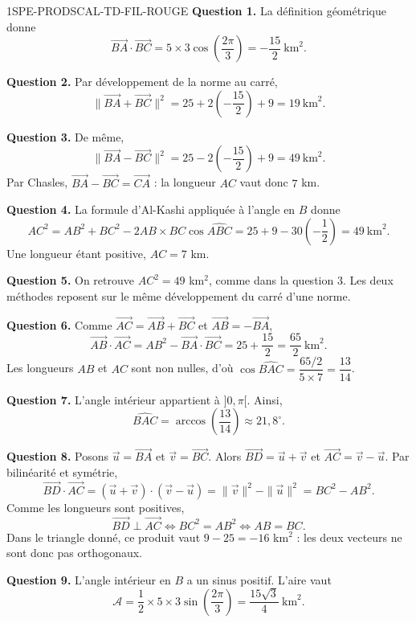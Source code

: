\ifnxVersionProfesseur
\begin{corrige}{1SPE-PRODSCAL-TD-FIL-ROUGE}
\textbf{Question 1.}
La définition géométrique donne
\[
\overrightarrow{BA}\cdot\overrightarrow{BC}
=5\times3\cos\left(\frac{2\pi}{3}\right)
=-\frac{15}{2}\ \text{km}^2.
\]

\textbf{Question 2.}
Par développement de la norme au carré,
\[
\|\overrightarrow{BA}+\overrightarrow{BC}\|^2
=25+2\left(-\frac{15}{2}\right)+9=19\ \text{km}^2.
\]

\textbf{Question 3.}
De même,
\[
\|\overrightarrow{BA}-\overrightarrow{BC}\|^2
=25-2\left(-\frac{15}{2}\right)+9=49\ \text{km}^2.
\]
Par Chasles, $\overrightarrow{BA}-\overrightarrow{BC}
=\overrightarrow{CA}$ : la longueur $AC$ vaut donc $7$ km.

\textbf{Question 4.}
La formule d'Al-Kashi appliquée à l'angle en $B$ donne
\[
AC^2=AB^2+BC^2-2AB\times BC\cos\widehat{ABC}
=25+9-30\left(-\frac12\right)=49\ \text{km}^2.
\]
Une longueur étant positive, $AC=7$ km.

\textbf{Question 5.}
On retrouve $AC^2=49$ km$^2$, comme dans la question 3.
Les deux méthodes reposent sur le même développement du carré d'une norme.

\textbf{Question 6.}
Comme $\overrightarrow{AC}=\overrightarrow{AB}+\overrightarrow{BC}$ et
$\overrightarrow{AB}=-\overrightarrow{BA}$,
\[
\overrightarrow{AB}\cdot\overrightarrow{AC}
=AB^2-\overrightarrow{BA}\cdot\overrightarrow{BC}
=25+\frac{15}{2}=\frac{65}{2}\ \text{km}^2.
\]
Les longueurs $AB$ et $AC$ sont non nulles, d'où
$\cos\widehat{BAC}=\dfrac{65/2}{5\times7}=\dfrac{13}{14}$.

\textbf{Question 7.}
L'angle intérieur appartient à $]0,\pi[$. Ainsi,
\[
\widehat{BAC}=\arccos\left(\frac{13}{14}\right)
\approx21{,}8^\circ.
\]

\textbf{Question 8.}
Posons $\vec u=\overrightarrow{BA}$ et $\vec v=\overrightarrow{BC}$.
Alors $\overrightarrow{BD}=\vec u+\vec v$ et
$\overrightarrow{AC}=\vec v-\vec u$. Par bilinéarité et symétrie,
\[
\overrightarrow{BD}\cdot\overrightarrow{AC}
=(\vec u+\vec v)\cdot(\vec v-\vec u)
=\|\vec v\|^2-\|\vec u\|^2=BC^2-AB^2.
\]
Comme les longueurs sont positives,
\[
\overrightarrow{BD}\perp\overrightarrow{AC}
\iff BC^2=AB^2\iff AB=BC.
\]
Dans le triangle donné, ce produit vaut $9-25=-16$ km$^2$ :
les deux vecteurs ne sont donc pas orthogonaux.

\textbf{Question 9.}
L'angle intérieur en $B$ a un sinus positif. L'aire vaut
\[
\mathcal A=\frac12\times5\times3\sin\left(\frac{2\pi}{3}\right)
=\frac{15\sqrt3}{4}\ \text{km}^2.
\]


\end{corrige}
